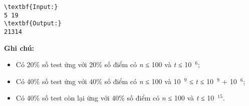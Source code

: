 \begin{verbatim}
\textbf{Input:}
5 19
\textbf{Output:}
21314
\end{verbatim}

\textbf{\textbf{Ghi chú:}}
\begin{itemize}
	\item Có 20\% số test ứng với 20\% số điểm có \emph{n }≤ 100 và \emph{t }≤ 10 $^6$;
	\item Có 40\% số test ứng với 40\% số điểm có \emph{n }≤ 100 và 10 $^9$ ≤ \emph{t }≤ 10 $^9$ + 10 $^6$;
	\item Có 40\% số test còn lại ứng với 40\% số điểm có \emph{n }≤ 100 và \emph{t }≤ 10 $^15$.
\end{itemize}